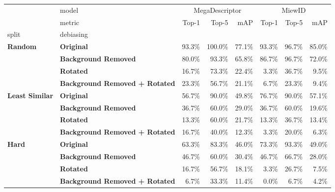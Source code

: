 \begin{tabular}{llrrrrrr}
\toprule
 & model & \multicolumn{3}{c}{MegaDescriptor} & \multicolumn{3}{c}{MiewID} \\
 & metric & Top-1 & Top-5 & mAP & Top-1 & Top-5 & mAP \\
split & debiasing &  &  &  &  &  &  \\
\midrule
\multirow[t]{4}{*}{\textbf{Random}} & \textbf{Original} & 93.3\% & 100.0\% & 77.1\% & 93.3\% & 96.7\% & 85.0\% \\
\textbf{} & \textbf{Background Removed} & 80.0\% & 93.3\% & 65.8\% & 86.7\% & 96.7\% & 72.0\% \\
\textbf{} & \textbf{Rotated} & 16.7\% & 73.3\% & 22.4\% & 3.3\% & 36.7\% & 9.5\% \\
\textbf{} & \textbf{Background Removed + Rotated} & 23.3\% & 56.7\% & 21.1\% & 6.7\% & 23.3\% & 9.4\% \\
\cline{1-8}
\multirow[t]{4}{*}{\textbf{Least Similar}} & \textbf{Original} & 56.7\% & 90.0\% & 49.8\% & 76.7\% & 90.0\% & 57.1\% \\
\textbf{} & \textbf{Background Removed} & 36.7\% & 60.0\% & 29.0\% & 36.7\% & 60.0\% & 19.6\% \\
\textbf{} & \textbf{Rotated} & 13.3\% & 60.0\% & 21.7\% & 13.3\% & 36.7\% & 13.4\% \\
\textbf{} & \textbf{Background Removed + Rotated} & 16.7\% & 40.0\% & 12.3\% & 3.3\% & 20.0\% & 6.3\% \\
\cline{1-8}
\multirow[t]{4}{*}{\textbf{Hard}} & \textbf{Original} & 63.3\% & 83.3\% & 46.0\% & 73.3\% & 93.3\% & 49.0\% \\
\textbf{} & \textbf{Background Removed} & 46.7\% & 60.0\% & 30.4\% & 46.7\% & 66.7\% & 28.0\% \\
\textbf{} & \textbf{Rotated} & 16.7\% & 56.7\% & 18.1\% & 3.3\% & 26.7\% & 7.5\% \\
\textbf{} & \textbf{Background Removed + Rotated} & 6.7\% & 33.3\% & 11.4\% & 0.0\% & 6.7\% & 4.2\% \\
\cline{1-8}
\bottomrule
\end{tabular}
